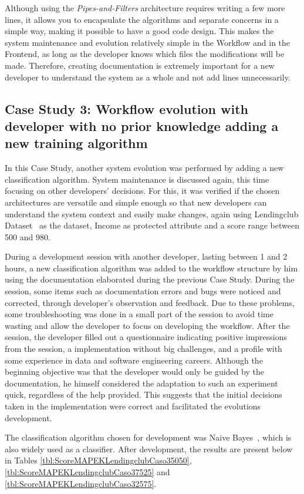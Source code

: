 \documentclass[runningheads]{llncs}
\begin{document}
Although using the \textit{Pipes-and-Filters} architecture requires writing a few more lines, it allows you to encapsulate the algorithms and separate concerns in a simple way, making it possible to have a good code design. This makes the system maintenance and evolution relatively simple in the Workflow and in the Frontend, as long as the developer knows which files the modifications will be made. Therefore, creating documentation is extremely important for a new developer to understand the system as a whole and not add lines unnecessarily.

\subsection{Case Study 3: Workflow evolution with developer with no prior knowledge adding a new training algorithm}

In this Case Study, another system evolution was performed by adding a new classification algorithm. System maintenance is discussed again, this time focusing on other developers' decisions. For this, it was verified if the chosen architectures are versatile and simple enough so that new developers can understand the system context and easily make changes, again using Lendingclub Dataset~\citep{lendingclub_2022} as the dataset, Income as protected attribute and a score range between 500 and 980.

During a development session with another developer, lasting between 1 and 2 hours, a new classification algorithm was added to the workflow structure by him using the documentation elaborated during the previous Case Study. During the session, some items such as documentation errors and bugs were noticed and corrected, through developer's observation and feedback. Due to these problems, some troubleshooting was done in a small part of the session to avoid time wasting and allow the developer to focus on developing the workflow. After the session, the developer filled out a questionnaire indicating positive impressions from the session, a implementation without big challenges, and a profile with some experience in data and software engineering careers. Although the beginning objective was that the developer would only be guided by the documentation, he himself considered the adaptation to such an experiment quick, regardless of the help provided. This suggests that the initial decisions taken in the implementation were correct and facilitated the evolutions development.

The classification algorithm chosen for development was Naive Bayes~\citep{Naive_Bayes_2004}, which is also widely used as a classifier. After development, the results are present below in Tables \ref{tbl:ScoreMAPEKLendingclubCaso35050}, \ref{tbl:ScoreMAPEKLendingclubCaso37525} and \ref{tbl:ScoreMAPEKLendingclubCaso32575}.
\end{document}
